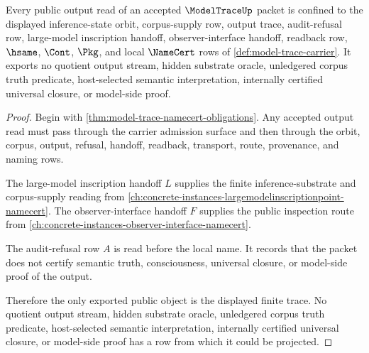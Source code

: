 \begin{theorem}
\label{thm:model-trace-output-nonescape}
Every public output read of an accepted $\ModelTraceUp$ packet is confined to the displayed inference-state orbit, corpus-supply row, output trace, audit-refusal row, large-model inscription handoff, observer-interface handoff, readback row, $\hsame$, $\Cont$, $\Pkg$, and local $\NameCert$ rows of \autoref{def:model-trace-carrier}. It exports no quotient output stream, hidden substrate oracle, unledgered corpus truth predicate, host-selected semantic interpretation, internally certified universal closure, or model-side proof.
\end{theorem}
\begin{proof}
Begin with \autoref{thm:model-trace-namecert-obligations}. Any accepted output read must pass through the carrier admission surface and then through the orbit, corpus, output, refusal, handoff, readback, transport, route, provenance, and naming rows.

The large-model inscription handoff $L$ supplies the finite inference-substrate and corpus-supply reading from \autoref{ch:concrete-instances-largemodelinscriptionpoint-namecert}. The observer-interface handoff $F$ supplies the public inspection route from \autoref{ch:concrete-instances-observer-interface-namecert}.

The audit-refusal row $A$ is read before the local name. It records that the packet does not certify semantic truth, consciousness, universal closure, or model-side proof of the output.

Therefore the only exported public object is the displayed finite trace. No quotient output stream, hidden substrate oracle, unledgered corpus truth predicate, host-selected semantic interpretation, internally certified universal closure, or model-side proof has a row from which it could be projected.
\end{proof}




